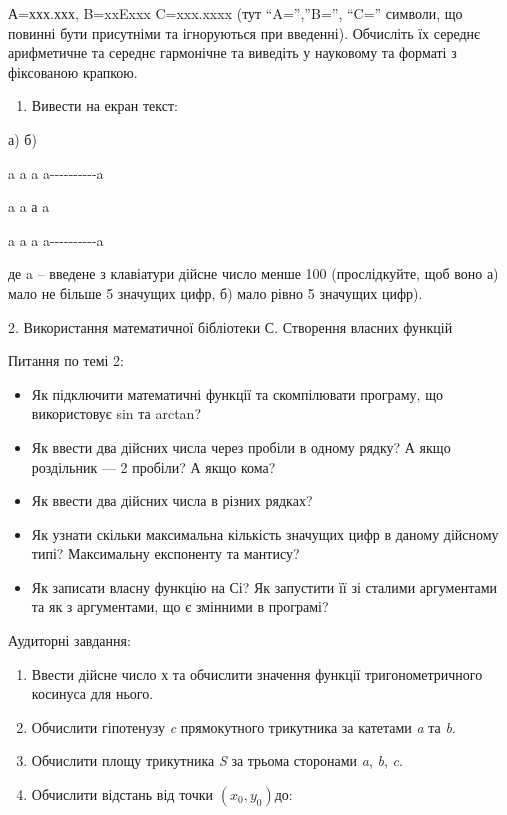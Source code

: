 \documentclass[]{article}
\begin{document}
А=ххх.ххх, B=xxExxx C=xxx.xxxx (тут ``A='',''B='', ``C='' символи, що
повинні бути присутніми та ігноруються при введенні). Обчисліть їх
середнє арифметичне та середнє гармонічне та виведіть у науковому та
форматі з фіксованою крапкою.

\begin{enumerate}
\def\labelenumi{\arabic{enumi}.}
\item
  Вивести на екран текст:
\end{enumerate}

а) б)

a a a a-\/-\/-\/-\/-\/-\/-\/-\/-\/-a

a a а \textbar{} a \textbar{}

a a a a-\/-\/-\/-\/-\/-\/-\/-\/-\/-a

де a -- введене з клавіатури дійсне число менше 100 (прослідкуйте, щоб
воно а) мало не більше 5 значущих цифр, б) мало рівно 5 значущих цифр).

2. Використання математичної бібліотеки С. Створення власних функцій

Питання по темі 2:

\begin{itemize}
\item
  Як підключити математичні функції та скомпілювати програму, що
  використовує sin та arctan?
\item
  Як ввести два дійсних числа через пробіли в одному рядку? А якщо
  роздільник --- 2 пробіли? А якщо кома?
\end{itemize}

\begin{itemize}
\item
  Як ввести два дійсних числа в різних рядках?
\item
  Як узнати скільки максимальна кількість значущих цифр в даному
  дійсному типі? Максимальну експоненту та мантису?
\item
  Як записати власну функцію на Сі? Як запустити її зі сталими
  аргументами та як з аргументами, що є змінними в програмі?
\end{itemize}

Аудиторні завдання:

\begin{enumerate}
\def\labelenumi{\arabic{enumi})}
\item
  Ввести дійсне число х та обчислити значення функції тригонометричного
  косинуса для нього.
\item
  Обчислити гіпотенузу \emph{c} прямокутного трикутника за катетами
  \emph{a} та \emph{b}.
\item
  Обчислити площу трикутника \emph{S} за трьома сторонами \emph{a},
  \emph{b}, \emph{c}.
\item
  Обчислити відстань від точки \((x_{0},y_{0})\)до:
\end{enumerate}
\end{document}
